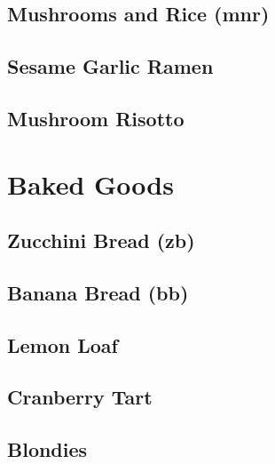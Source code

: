 \documentclass{report}
\begin{document}
\section{Mushrooms and Rice (mnr)}

\newpage
\section{Sesame Garlic Ramen}

\newpage
\section{Mushroom Risotto}




\chapter{Baked Goods}
\newpage
\section{Zucchini Bread (zb)}


\newpage
\section{Banana Bread (bb)}


\newpage
\section{Lemon Loaf}


\newpage 
\section{Cranberry Tart}


\newpage
\section{Blondies}

\end{document}
